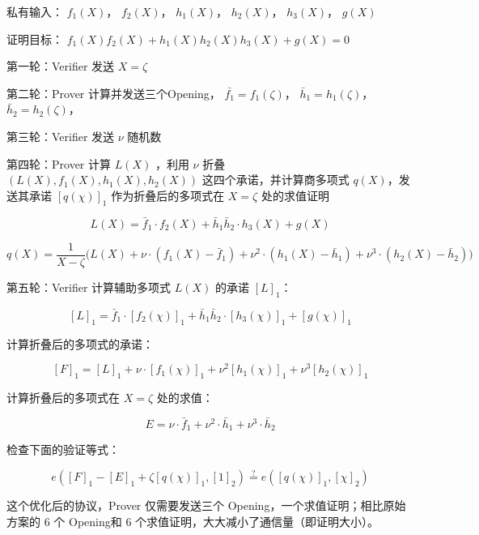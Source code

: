私有输入： \(f_1(X)\)， \(f_2(X)\)， \(h_1(X)\)， \(h_2(X)\)，
\(h_3(X)\)， \(g(X)\)

证明目标： \(f_1(X)f_2(X) + h_1(X)h_2(X)h_3(X) + g(X) = 0\)

第一轮：Verifier 发送 \(X=\zeta\)

第二轮：Prover 计算并发送三个Opening， \(\bar{f_1}=f_1(\zeta)\)，
\(\bar{h}_1=h_1(\zeta)\)， \(\bar{h}_2=h_2(\zeta)\)，

第三轮：Verifier 发送 \(\nu\) 随机数

第四轮：Prover 计算 \(L(X)\) ，利用 \(\nu\) 折叠
\((L(X), f_1(X),h_1(X),h_2(X))\) 这四个承诺，并计算商多项式
\(q(X)\)，发送其承诺 \([q(\chi)]_1\) 作为折叠后的多项式在 \(X=\zeta\)
处的求值证明

\[
L(X)=\bar{f}_1\cdot f_2(X) + \bar{h}_1\bar{h}_2\cdot h_3(X) + g(X)
\]

\[
q(X)=\frac{1}{X-\zeta}\Big(L(X) + \nu\cdot (f_1(X)-\bar{f}_1)+\nu^2\cdot (h_1(X)-\bar{h}_1)+\nu^3\cdot (h_2(X)-\bar{h}_2)\Big)
\]

第五轮：Verifier 计算辅助多项式 \(L(X)\) 的承诺 \([L]_1\)：

\[
[L]_1 = \bar{f}_1\cdot[f_2(\chi)]_1 + \bar{h}_1\bar{h}_2\cdot[h_3(\chi)]_1 + [g(\chi)]_1
\]

计算折叠后的多项式的承诺：

\[
[F]_1=[L]_1 + \nu \cdot  [f_1(\chi)]_1+\nu^2[h_1(\chi)]_1+\nu^3[h_2(\chi)]_1
\]

计算折叠后的多项式在 \(X=\zeta\) 处的求值：

\[
E=\nu\cdot \bar{f}_1 + \nu^2\cdot\bar{h}_1+ \nu^3\cdot\bar{h}_2
\]

检查下面的验证等式：

\[
e([F]_1-[E]_1 + \zeta[q(\chi)]_1, [1]_2)\overset{?}{=}e([q(\chi)]_1, [\chi]_2)
\]

这个优化后的协议，Prover 仅需要发送三个
Opening，一个求值证明；相比原始方案的 6 个 Opening和 6
个求值证明，大大减小了通信量（即证明大小）。




